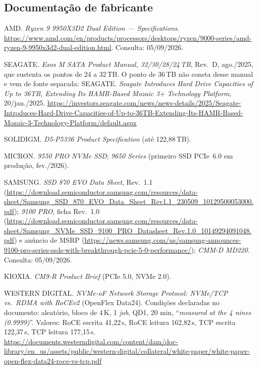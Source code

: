 \documentclass[11pt,a4paper]{article}
\begin{document}
\subsection*{Documentação de fabricante}
\begin{enumerate}[label={[\arabic*]},leftmargin=*,start=17]
\item AMD. \emph{Ryzen 9 9950X3D2 Dual Edition --- Specifications}.
      \url{https://www.amd.com/en/products/processors/desktops/ryzen/9000-series/amd-ryzen-9-9950x3d2-dual-edition.html}.
      Consulta: 05/09/2026.
\item SEAGATE. \emph{Exos M SATA Product Manual, 32/30/28/24\,TB}, Rev.~D, ago./2025, que
      sustenta os pontos de 24 a 32\,TB. O ponto de 36\,TB não consta desse manual e vem de fonte
      separada: SEAGATE. \emph{Seagate Introduces Hard Drive Capacities of Up to 36TB, Extending
      Its HAMR-Based Mozaic 3+ Technology Platform}, 20/jan./2025.
      \url{https://investors.seagate.com/news/news-details/2025/Seagate-Introduces-Hard-Drive-Capacities-of-Up-to-36TB-Extending-Its-HAMR-Based-Mozaic-3-Technology-Platform/default.aspx}
\item SOLIDIGM. \emph{D5-P5336 Product Specification} (até 122,88\,TB).
\item MICRON. \emph{9550 PRO NVMe SSD}; \emph{9650 Series} (primeiro SSD PCIe~6.0 em
      produção, fev./2026).
\item SAMSUNG. \emph{SSD 870 EVO Data Sheet}, Rev.~1.1
      (\url{https://download.semiconductor.samsung.com/resources/data-sheet/Samsung_SSD_870_EVO_Data_Sheet_Rev1.1_230509_10129500053000.pdf});
      \emph{9100 PRO}, ficha Rev.~1.0
      (\url{https://download.semiconductor.samsung.com/resources/data-sheet/Samsung_NVMe_SSD_9100_PRO_Datasheet_Rev.1.0_10149294091048.pdf})
      e anúncio de MSRP
      (\url{https://news.samsung.com/us/samsung-announces-9100-pro-series-ssds-with-breakthrough-pcie-5-0-performance/});
      \emph{CMM-D MD220}. Consulta: 05/09/2026.
\item KIOXIA. \emph{CM9-R Product Brief} (PCIe 5.0, NVMe 2.0).
\item WESTERN DIGITAL. \emph{NVMe-oF Network Storage Protocol: NVMe/TCP vs.\ RDMA with
      RoCEv2} (OpenFlex Data24). Condições declaradas no documento: aleatório, bloco de 4\,K,
      1 \emph{job}, QD1, 20 min, ``\emph{measured at the 4 nines (0.9999)}''. Valores:
      RoCE escrita 41,22\,\textmu s, RoCE leitura 162,82\,\textmu s, TCP escrita
      122,37\,\textmu s, TCP leitura 177,15\,\textmu s.
      \url{https://documents.westerndigital.com/content/dam/doc-library/en_us/assets/public/western-digital/collateral/white-paper/white-paper-open-flex-data24-roce-vs-tcp.pdf}

\end{enumerate}
\end{document}
